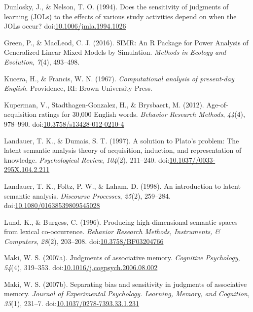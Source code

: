 \documentclass[english,man]{apa6}
\theoremstyle{definition}
\theoremstyle{definition}
\theoremstyle{remark}
\begin{document}
\hypertarget{ref-Dunlosky1994a}{}
Dunlosky, J., \& Nelson, T. O. (1994). Does the sensitivity of judgments
of learning (JOLs) to the effects of various study activities depend on
when the JOLs occur?
doi:\href{https://doi.org/10.1006/jmla.1994.1026}{10.1006/jmla.1994.1026}

\hypertarget{ref-Green2016}{}
Green, P., \& MacLeod, C. J. (2016). SIMR: An R Package for Power
Analysis of Generalized Linear Mixed Models by Simulation. \emph{Methods
in Ecology and Evolution}, \emph{7}(4), 493--498.

\hypertarget{ref-Kucera1967}{}
Kucera, H., \& Francis, W. N. (1967). \emph{Computational analysis of
present-day English}. Providence, RI: Brown University Press.

\hypertarget{ref-Kuperman2012}{}
Kuperman, V., Stadthagen-Gonzalez, H., \& Brysbaert, M. (2012).
Age-of-acquisition ratings for 30,000 English words. \emph{Behavior
Research Methods}, \emph{44}(4), 978--990.
doi:\href{https://doi.org/10.3758/s13428-012-0210-4}{10.3758/s13428-012-0210-4}

\hypertarget{ref-Landauer1997}{}
Landauer, T. K., \& Dumais, S. T. (1997). A solution to Plato's problem:
The latent semantic analysis theory of acquisition, induction, and
representation of knowledge. \emph{Psychological Review}, \emph{104}(2),
211--240.
doi:\href{https://doi.org/10.1037//0033-295X.104.2.211}{10.1037//0033-295X.104.2.211}

\hypertarget{ref-Landauer1998}{}
Landauer, T. K., Foltz, P. W., \& Laham, D. (1998). An introduction to
latent semantic analysis. \emph{Discourse Processes}, \emph{25}(2),
259--284.
doi:\href{https://doi.org/10.1080/01638539809545028}{10.1080/01638539809545028}

\hypertarget{ref-Lund1996}{}
Lund, K., \& Burgess, C. (1996). Producing high-dimensional semantic
spaces from lexical co-occurrence. \emph{Behavior Research Methods,
Instruments, \& Computers}, \emph{28}(2), 203--208.
doi:\href{https://doi.org/10.3758/BF03204766}{10.3758/BF03204766}

\hypertarget{ref-Maki2007a}{}
Maki, W. S. (2007a). Judgments of associative memory. \emph{Cognitive
Psychology}, \emph{54}(4), 319--353.
doi:\href{https://doi.org/10.1016/j.cogpsych.2006.08.002}{10.1016/j.cogpsych.2006.08.002}

\hypertarget{ref-Maki2007}{}
Maki, W. S. (2007b). Separating bias and sensitivity in judgments of
associative memory. \emph{Journal of Experimental Psychology. Learning,
Memory, and Cognition}, \emph{33}(1), 231--7.
doi:\href{https://doi.org/10.1037/0278-7393.33.1.231}{10.1037/0278-7393.33.1.231}
\end{document}
